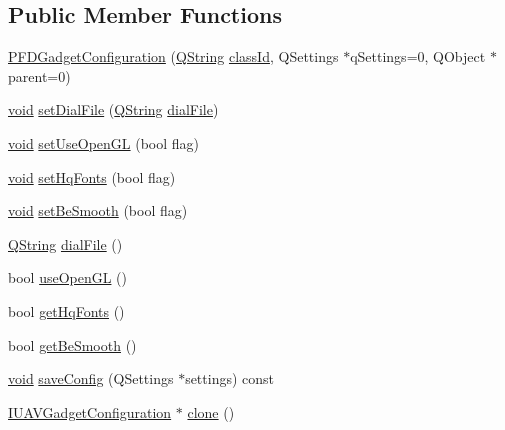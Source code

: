 \subsection*{\-Public \-Member \-Functions}
\begin{DoxyCompactItemize}
\item 
\hyperlink{group___p_f_d_plugin_gacb5ca139ed284444e5e173641b6001bd}{\-P\-F\-D\-Gadget\-Configuration} (\hyperlink{group___u_a_v_objects_plugin_gab9d252f49c333c94a72f97ce3105a32d}{\-Q\-String} \hyperlink{group___core_plugin_gac953657221ba7fda967ada0408332641}{class\-Id}, \-Q\-Settings $\ast$q\-Settings=0, \-Q\-Object $\ast$parent=0)
\item 
\hyperlink{group___u_a_v_objects_plugin_ga444cf2ff3f0ecbe028adce838d373f5c}{void} \hyperlink{group___p_f_d_plugin_gae14181eda65a05f6f8ad21aa6a531aaa}{set\-Dial\-File} (\hyperlink{group___u_a_v_objects_plugin_gab9d252f49c333c94a72f97ce3105a32d}{\-Q\-String} \hyperlink{group___p_f_d_plugin_ga0c75d60343b097f8da312d96e5fa8a68}{dial\-File})
\item 
\hyperlink{group___u_a_v_objects_plugin_ga444cf2ff3f0ecbe028adce838d373f5c}{void} \hyperlink{group___p_f_d_plugin_ga8a6a328024b4a742149d9922328a014b}{set\-Use\-Open\-G\-L} (bool flag)
\item 
\hyperlink{group___u_a_v_objects_plugin_ga444cf2ff3f0ecbe028adce838d373f5c}{void} \hyperlink{group___p_f_d_plugin_gaf36027ad5fc6d02f4433df45538cef4f}{set\-Hq\-Fonts} (bool flag)
\item 
\hyperlink{group___u_a_v_objects_plugin_ga444cf2ff3f0ecbe028adce838d373f5c}{void} \hyperlink{group___p_f_d_plugin_ga8a3abfa9447e111ebdfdddb6b005be4b}{set\-Be\-Smooth} (bool flag)
\item 
\hyperlink{group___u_a_v_objects_plugin_gab9d252f49c333c94a72f97ce3105a32d}{\-Q\-String} \hyperlink{group___p_f_d_plugin_ga0c75d60343b097f8da312d96e5fa8a68}{dial\-File} ()
\item 
bool \hyperlink{group___p_f_d_plugin_ga9ee42411026741bf10767ec9bddf4f5e}{use\-Open\-G\-L} ()
\item 
bool \hyperlink{group___p_f_d_plugin_ga618cd55f8f758294cbed557e9e610eb6}{get\-Hq\-Fonts} ()
\item 
bool \hyperlink{group___p_f_d_plugin_ga50b05c372ea7566767fee660a4e811f3}{get\-Be\-Smooth} ()
\item 
\hyperlink{group___u_a_v_objects_plugin_ga444cf2ff3f0ecbe028adce838d373f5c}{void} \hyperlink{group___p_f_d_plugin_ga31f17afc274f0b137893d28f61adb4ca}{save\-Config} (\-Q\-Settings $\ast$settings) const 
\item 
\hyperlink{group___core_plugin_gacdfdf0b1e39b5002472b76b6564ce51f}{\-I\-U\-A\-V\-Gadget\-Configuration} $\ast$ \hyperlink{group___p_f_d_plugin_gabe4d60a242c6090fd1df05c1da47e165}{clone} ()
\end{DoxyCompactItemize}


